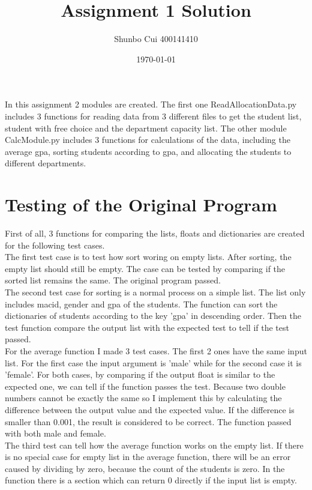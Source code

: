 \documentclass[12pt]{article}
\title{Assignment 1 Solution}
\author{Shunbo Cui 400141410}
\date{\today}
\begin{document}
\maketitle

In this assignment 2 modules are created. The first one ReadAllocationData.py includes 3 functions for reading data from 3 different files to get the student list, student with free choice and the department capacity list. The other module CalcModule.py includes 3 functions for calculations of the data, including the average gpa, sorting students according to gpa, and allocating the students to different departments.

\section{Testing of the Original Program}

First of all, 3 functions for comparing the lists, floats and dictionaries are created for the following test cases.\\
The first test case is to test how sort woring on empty lists. After sorting, the empty list should still be empty. The case can be tested by comparing if the sorted list remains the same. The original program passed.\\
The second test case for sorting is a normal process on a simple list. The list only includes macid, gender and gpa of the students. The function can sort the dictionaries of students according to the key 'gpa' in descending order. Then the test function compare the output list with the expected test to tell if the test passed.\\
For the average function I made 3 test cases. The first 2 ones have the same input list. For the first case the input argument is 'male' while for the second case it is 'female'. For both cases, by comparing if the output float is similar to the expected one, we can tell if the function passes the test. Because two double numbers cannot be exactly the same so I implement this by calculating the difference between the output value and the expected value. If the difference is smaller than 0.001, the result is considered to be correct. The function passed with both male and female.\\
The third test can tell how the average function works on the empty list. If there is no special case for empty list in the average function, there will be an error caused by dividing by zero, because the count of the students is zero. In the function there is a section which can return 0 directly if the input list is empty.\\
\end{document}
